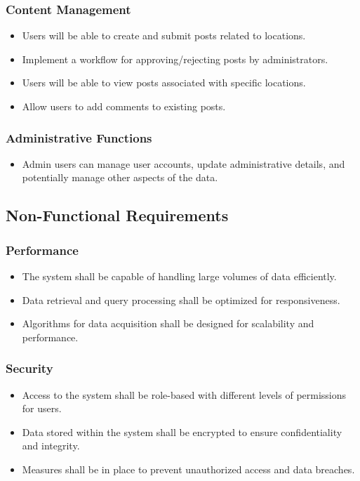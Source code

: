 \subsubsection{Content Management}
\begin{itemize}
    \item Users will be able to create and submit posts related to locations.
    \item Implement a workflow for approving/rejecting posts by administrators.
    \item Users will be able to view posts associated with specific locations.
    \item Allow users to add comments to existing posts.
\end{itemize}

\subsubsection{Administrative Functions}
\begin{itemize}
    \item Admin users can manage user accounts, update administrative details, and potentially manage other aspects of the data.
\end{itemize}

\subsection{Non-Functional Requirements}
\subsubsection{Performance}
\begin{itemize}
    \item The system shall be capable of handling large volumes of data efficiently.
    \item Data retrieval and query processing shall be optimized for responsiveness.
    \item Algorithms for data acquisition shall be designed for scalability and performance.
\end{itemize}

\subsubsection{Security}
\begin{itemize}
    \item Access to the system shall be role-based with different levels of permissions for users.
    \item Data stored within the system shall be encrypted to ensure confidentiality and integrity.
    \item Measures shall be in place to prevent unauthorized access and data breaches.
\end{itemize}

